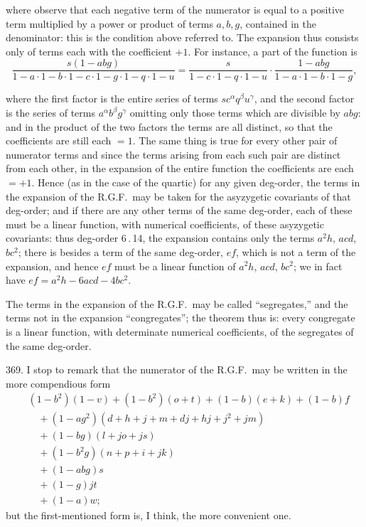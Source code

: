 \documentclass[11pt]{article}
\begin{document}
where observe that each negative term of the numerator is equal to a positive term multiplied by a power or product of terms $a, b, g$, contained in the denominator: this is the condition above referred to. The expansion thus consists only of terms each with the coefficient $+1$. For instance, a part of the function is
\[
\frac{s(1 - abg)}{1 - a\cdot 1 - b\cdot 1 - c\cdot 1 - g\cdot 1 - q\cdot 1 - u} = \frac{s}{1 - c\cdot 1 - q\cdot 1 - u}\cdot\frac{1 - abg}{1 - a\cdot 1 - b\cdot 1 - g},
\]


\noindent where the first factor is the entire series of terms $s c^{\alpha} q^{\beta} u^{\gamma}$, and the second factor is the series of terms $a^{\alpha}b^{\beta}g^{\gamma}$ omitting only those terms which are divisible by $abg$: and in the product of the two factors the terms are all distinct, so that the coefficients are still each $=1$. The same thing is true for every other pair of numerator terms and since the terms arising from each such pair are distinct from each other, in the expansion of the entire function the coefficients are each $=+1$. Hence (as in the case of the quartic) for any given deg-order, the terms in the expansion of the R.G.F.\ may be taken for the asyzygetic covariants of that deg-order; and if there are any other terms of the same deg-order, each of these must be a linear function, with numerical coefficients, of these asyzygetic covariants: thus deg-order 6\,.\,14, the expansion contains only the terms $a^{2}h$, $acd$, $bc^{2}$; there is besides a term of the same deg-order, $ef$, which is not a term of the expansion, and hence $ef$ must be a linear function of $a^{2}h$, $acd$, $bc^{2}$; we in fact have $ef = a^{2}h - 6acd - 4bc^{2}$.

The terms in the expansion of the R.G.F.\ may be called ``segregates,'' and the terms not in the expansion ``congregates''; the theorem thus is: every congregate is a linear function, with determinate numerical coefficients, of the segregates of the same deg-order.

369. I stop to remark that the numerator of the R.G.F.\ may be written in the more compendious form
\begin{align*}
& (1 - b^{2})(1 - v) + (1 - b^{2})(o + t) + (1 - b)(e + k) + (1 - b)f\\
& \quad + (1 - ag^{2})(d + h + j + m + dj + hj + j^{2} + jm)\\
& \quad + (1 - bg)(l + jo + js)\\
& \quad + (1 - b^{2}g)(n + p + i + jk)\\
& \quad + (1 - abg)s\\
& \quad + (1 - g)jt\\
& \quad + (1 - a)w;
\end{align*}
but the first-mentioned form is, I think, the more convenient one.
\end{document}
